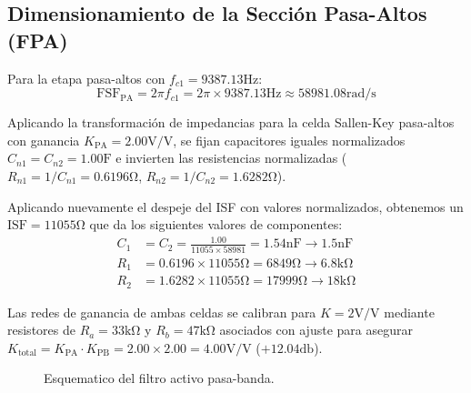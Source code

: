 \subsection{Dimensionamiento de la Sección Pasa-Altos (FPA)}
Para la etapa pasa-altos con $f_{c1} = 9387.13 \unit{\hertz}$:
\begin{equation*}
    \text{FSF}_{\text{PA}} = 2\pi f_{c1} = 2\pi \times 9387.13 \unit{\hertz} \approx 58981.08 \unit{\radian\per\second}
\end{equation*}

Aplicando la transformación de impedancias para la celda Sallen-Key pasa-altos con ganancia $K_{\text{PA}} = 2.00
\unit{\volt\per\volt}$, se fijan capacitores iguales normalizados $C_{n1} = C_{n2} = 1.00 \unit{\farad}$ e invierten las
resistencias normalizadas ($R_{n1} = 1/C_{n1} = 0.6196 \unit{\ohm}$, $R_{n2} = 1/C_{n2} = 1.6282 \unit{\ohm}$).

Aplicando nuevamente el despeje del ISF con valores normalizados, obtenemos un $\text{ISF} = 11055 \unit{\ohm}$ que da
los siguientes valores de componentes:
\begin{align*}
    C_1 &= C_2 = \frac{1.00}{11055 \times 58981} = 1.54 \unit{\nano\farad} \to 1.5 \unit{\nano\farad} \\
    R_1 &= 0.6196 \times 11055 \unit{\ohm} = 6849 \unit{\ohm} \to 6.8 \unit{\kilo\ohm} \\
    R_2 &= 1.6282 \times 11055 \unit{\ohm} = 17999 \unit{\ohm} \to 18 \unit{\kilo\ohm}
\end{align*}

Las redes de ganancia de ambas celdas se calibran para $K = 2 \unit{\volt\per\volt}$ mediante resistores de
$R_a = 33 \unit{\kilo\ohm}$ y $R_b = 47 \unit{\kilo\ohm}$ asociados con ajuste para asegurar
$K_{\text{total}} = K_{\text{PA}} \cdot K_{\text{PB}} = 2.00 \times 2.00 = 4.00 \unit{\volt\per\volt}$
($+12.04 \unit{\decibel}$).

\begin{figure}[!ht]
    \centering
    
    \caption{Esquematico del filtro activo pasa-banda.}
    \label{fig.ej4:sch}
\end{figure}

